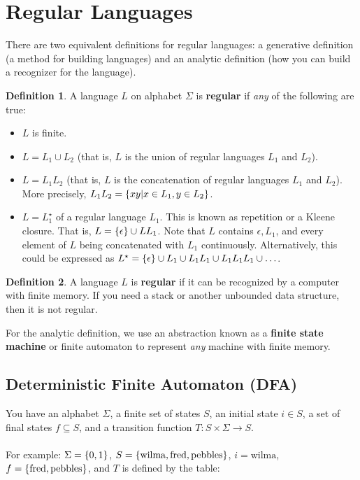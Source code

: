 \documentclass[]{article}
\DeclarePairedDelimiter{\set}{\lbrace}{\rbrace}
\theoremstyle{definition}
\newtheorem*{defn}{Definition}
\begin{document}
	\section{Regular Languages}
		There are two equivalent definitions for regular languages: a generative definition (a method for building languages) and an analytic definition (how you can build a recognizer for the language).
		\begin{defn}
			A language $L$ on alphabet $\Sigma$ is \textbf{regular} if \emph{any} of the following are true:
			\begin{itemize}
				\item $L$ is finite.
				\item $L = L_1 \cup L_2$ (that is, $L$ is the union of regular languages $L_1$ and $L_2$).
				\item $L = L_1 L_2$ (that is, $L$ is the concatenation of regular languages $L_1$ and $L_2$). More precisely, $L_1 L_2 = \set{xy | x \in L_1, y \in L_2}$.
				\item $L = L_1^\star$ of a regular language $L_1$. This is known as repetition or a Kleene closure. That is, $L = \set{\epsilon} \cup L L_1$. Note that $L$ contains $\epsilon, L_1$, and every element of $L$ being concatenated with $L_1$ continuously. Alternatively, this could be expressed as $L^\star = \set{\epsilon} \cup L_1 \cup L_1 L_1 \cup L_1 L_1 L_1 \cup \ldots$.
			\end{itemize}
		\end{defn}

		\begin{defn}
			A language $L$ is \textbf{regular} if it can be recognized by a computer with finite memory. If you need a stack or another unbounded data structure, then it is not regular.
		\end{defn}

		For the analytic definition, we use an abstraction known as a \textbf{finite state machine} or {finite automaton} to represent \emph{any} machine with finite memory.
		\subsection{Deterministic Finite Automaton (DFA)}
			You have an alphabet $\Sigma$, a finite set of states $S$, an initial state $i \in S$, a set of final states $f \subseteq S$, and a transition function $T: S \times \Sigma \to S$.
			\\ \\
			For example: $\Sigma = \set{0, 1}$, $S = \set{\text{wilma}, \text{fred}, \text{pebbles}}$, $i = \text{wilma}$, $f = \set{\text{fred}, \text{pebbles}}$, and $T$ is defined by the table:
\end{document}
